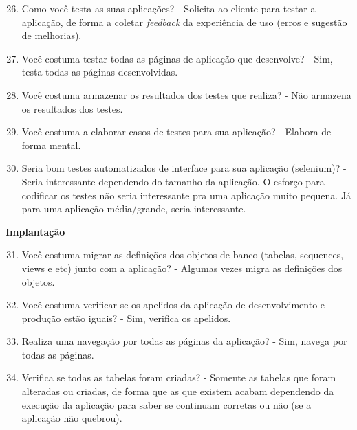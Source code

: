 \begin{apendicesenv}
\begin{enumerate}
	\setcounter{enumi}{25}
	\item Como você testa as suas aplicações?\newline
	- Solicita ao cliente para testar a aplicação, de forma a coletar \textit{feedback} da experiência de uso (erros e sugestão de melhorias).
	\item Você costuma testar todas as páginas de aplicação que desenvolve?\newline
	- Sim, testa todas as páginas desenvolvidas.
	\item Você costuma armazenar os resultados dos testes que realiza?\newline
	- Não armazena os resultados dos testes.
	\item Você costuma a elaborar casos de testes para sua aplicação?\newline
	- Elabora de forma mental.
	\item Seria bom testes automatizados de interface para sua aplicação (selenium)?\newline
	- Seria interessante dependendo do tamanho da aplicação. O esforço para codificar os testes não seria interessante pra uma aplicação muito pequena. Já para uma aplicação média/grande, seria interessante.
\end{enumerate}

\textbf{Implantação}

\begin{enumerate}
	\setcounter{enumi}{30}
	\item Você costuma migrar as definições dos objetos de banco (tabelas, sequences, views e
	etc) junto com a aplicação?\newline
	- Algumas vezes migra as definições dos objetos.
	\item Você costuma verificar se os apelidos da aplicação de desenvolvimento e produção
	estão iguais?\newline
	- Sim, verifica os apelidos.
	\item Realiza uma navegação por todas as páginas da aplicação?\newline
	- Sim, navega por todas as páginas.
	\item Verifica se todas as tabelas foram criadas?\newline
	- Somente as tabelas que foram alteradas ou criadas, de forma que as que existem acabam dependendo da execução da aplicação para saber se continuam corretas ou não (se a aplicação não quebrou).
\end{enumerate}


\end{apendicesenv}
